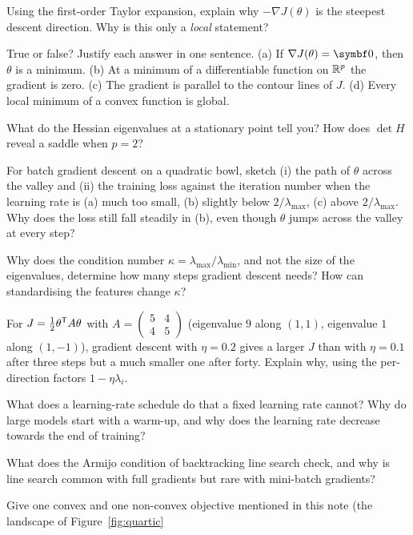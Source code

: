 \documentclass[11pt]{article}
\begin{document}
\begin{questions}
\begin{conceptual}
\item Using the first-order Taylor expansion, explain why $-\nabla J(\theta)$ is the steepest descent direction. Why is
this only a \emph{local} statement?
\item True or false? Justify each answer in one sentence. (a) If $\nabla J(\theta) = \vect{0}$, then $\theta$ is a
minimum. (b) At a minimum of a differentiable function on $\mathbb{R}^p$ the gradient is zero. (c) The gradient is parallel to
the contour lines of $J$. (d) Every local minimum of a convex function is global.
\item What do the Hessian eigenvalues at a stationary point tell you? How does $\det H$ reveal a saddle when $p = 2$?
\item For batch gradient descent on a quadratic bowl, sketch (i) the path of $\theta$ across the valley and (ii) the
training loss against the iteration number when the learning rate is (a) much too small, (b) slightly below
$2/\lambda_{\max}$, (c) above $2/\lambda_{\max}$. Why does the loss still fall steadily in (b), even though $\theta$
jumps across the valley at every step?
\item Why does the condition number $\kappa = \lambda_{\max}/\lambda_{\min}$, and not the size of the eigenvalues,
determine how many steps gradient descent needs? How can standardising the features change $\kappa$?
\item For $J = \frac12\theta^{\mathsf{T}} A\theta$ with $A = \begin{pmatrix} 5 & 4 \\ 4 & 5\end{pmatrix}$ (eigenvalue $9$ along
$(1, 1)$, eigenvalue $1$ along $(1, -1)$), gradient descent with $\eta = 0.2$ gives a larger $J$ than with
$\eta = 0.1$ after three steps but a much smaller one after forty. Explain why, using the per-direction factors
$1 - \eta\lambda_i$.
\item What does a learning-rate schedule do that a fixed learning rate cannot? Why do large models start with a
warm-up, and why does the learning rate decrease towards the end of training?
\item What does the Armijo condition of backtracking line search check, and why is line search common with full
gradients but rare with mini-batch gradients?
\item Give one convex and one non-convex objective mentioned in this note (the landscape of Figure~\ref{fig:quartic}

\end{conceptual}
\end{questions}
\end{document}
